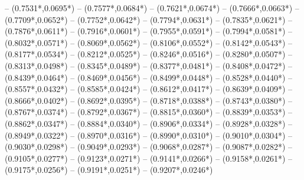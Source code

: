 {	-- ({0.7531*\dx},{0.0695*\dy})
	-- ({0.7577*\dx},{0.0684*\dy})
	-- ({0.7621*\dx},{0.0674*\dy})
	-- ({0.7666*\dx},{0.0663*\dy})
	-- ({0.7709*\dx},{0.0652*\dy})
	-- ({0.7752*\dx},{0.0642*\dy})
	-- ({0.7794*\dx},{0.0631*\dy})
	-- ({0.7835*\dx},{0.0621*\dy})
	-- ({0.7876*\dx},{0.0611*\dy})
	-- ({0.7916*\dx},{0.0601*\dy})
	-- ({0.7955*\dx},{0.0591*\dy})
	-- ({0.7994*\dx},{0.0581*\dy})
	-- ({0.8032*\dx},{0.0571*\dy})
	-- ({0.8069*\dx},{0.0562*\dy})
	-- ({0.8106*\dx},{0.0552*\dy})
	-- ({0.8142*\dx},{0.0543*\dy})
	-- ({0.8177*\dx},{0.0534*\dy})
	-- ({0.8212*\dx},{0.0525*\dy})
	-- ({0.8246*\dx},{0.0516*\dy})
	-- ({0.8280*\dx},{0.0507*\dy})
	-- ({0.8313*\dx},{0.0498*\dy})
	-- ({0.8345*\dx},{0.0489*\dy})
	-- ({0.8377*\dx},{0.0481*\dy})
	-- ({0.8408*\dx},{0.0472*\dy})
	-- ({0.8439*\dx},{0.0464*\dy})
	-- ({0.8469*\dx},{0.0456*\dy})
	-- ({0.8499*\dx},{0.0448*\dy})
	-- ({0.8528*\dx},{0.0440*\dy})
	-- ({0.8557*\dx},{0.0432*\dy})
	-- ({0.8585*\dx},{0.0424*\dy})
	-- ({0.8612*\dx},{0.0417*\dy})
	-- ({0.8639*\dx},{0.0409*\dy})
	-- ({0.8666*\dx},{0.0402*\dy})
	-- ({0.8692*\dx},{0.0395*\dy})
	-- ({0.8718*\dx},{0.0388*\dy})
	-- ({0.8743*\dx},{0.0380*\dy})
	-- ({0.8767*\dx},{0.0374*\dy})
	-- ({0.8792*\dx},{0.0367*\dy})
	-- ({0.8815*\dx},{0.0360*\dy})
	-- ({0.8839*\dx},{0.0353*\dy})
	-- ({0.8862*\dx},{0.0347*\dy})
	-- ({0.8884*\dx},{0.0340*\dy})
	-- ({0.8906*\dx},{0.0334*\dy})
	-- ({0.8928*\dx},{0.0328*\dy})
	-- ({0.8949*\dx},{0.0322*\dy})
	-- ({0.8970*\dx},{0.0316*\dy})
	-- ({0.8990*\dx},{0.0310*\dy})
	-- ({0.9010*\dx},{0.0304*\dy})
	-- ({0.9030*\dx},{0.0298*\dy})
	-- ({0.9049*\dx},{0.0293*\dy})
	-- ({0.9068*\dx},{0.0287*\dy})
	-- ({0.9087*\dx},{0.0282*\dy})
	-- ({0.9105*\dx},{0.0277*\dy})
	-- ({0.9123*\dx},{0.0271*\dy})
	-- ({0.9141*\dx},{0.0266*\dy})
	-- ({0.9158*\dx},{0.0261*\dy})
	-- ({0.9175*\dx},{0.0256*\dy})
	-- ({0.9191*\dx},{0.0251*\dy})
	-- ({0.9207*\dx},{0.0246*\dy})
}
